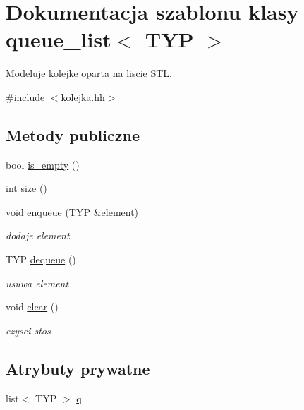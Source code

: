 \hypertarget{classqueue__list}{\section{Dokumentacja szablonu klasy queue\-\_\-list$<$ T\-Y\-P $>$}
\label{classqueue__list}
}


Modeluje kolejke oparta na liscie S\-T\-L.  




{\ttfamily \#include $<$kolejka.\-hh$>$}

\subsection*{Metody publiczne}
\begin{DoxyCompactItemize}
\item 
bool \hyperlink{classqueue__list_a762d9f9f56dc9552e8df07d1b732e8b0}{is\-\_\-empty} ()
\item 
int \hyperlink{classqueue__list_aa9d1aaf18cca43fcee4e0a0dfb212cd4}{size} ()
\item 
void \hyperlink{classqueue__list_ab2985d4f0192202336311fd89d836573}{enqueue} (T\-Y\-P \&element)
\begin{DoxyCompactList}\small\item\em dodaje element \end{DoxyCompactList}\item 
T\-Y\-P \hyperlink{classqueue__list_add17ee76e80f7e09cc470ba55bd4c131}{dequeue} ()
\begin{DoxyCompactList}\small\item\em usuwa element \end{DoxyCompactList}\item 
void \hyperlink{classqueue__list_a4dcb6bb4dfee45fb084dff647ded82f0}{clear} ()
\begin{DoxyCompactList}\small\item\em czysci stos \end{DoxyCompactList}\end{DoxyCompactItemize}
\subsection*{Atrybuty prywatne}
\begin{DoxyCompactItemize}
\item 
list$<$ T\-Y\-P $>$ \hyperlink{classqueue__list_a452a11e2c4872ff7b6622d06e6d01c98}{q}
\end{DoxyCompactItemize}


